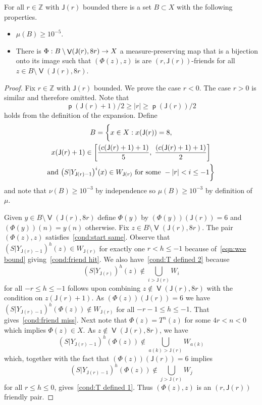\documentclass[AHL,Unicode,longabstracts,published]{cedram}
\DeclareMathOperator{\bad}{\mathsf{V}}
\DeclareMathOperator{\p}{\mathsf{p}}
\newcommand{\Z}{\mathbb{Z}}
\newcommand{\scl}{\mathsf{J}}
\let\originalleft\left
\let\originalright\right
\renewcommand{\left}{\mathopen{}\mathclose\bgroup\originalleft}
\renewcommand{\right}{\aftergroup\egroup\originalright}
\renewcommand*{\to}{\mathchoice{\longrightarrow}{\rightarrow}{\rightarrow}{\rightarrow}}
\begin{document}
\begin{theo}\label{thm:bounded wfriends}
For all $r \in \Z$ with $\scl(r)$ bounded there is a set $B \subset X$ with the following properties.
\begin{itemize}
\item $\mu(B) \ge 10^{-5}$.
\item There is $\Phi : B \setminus \bad(\scl(r),8r) \to X$ a measure-preserving map that is a bijection onto its image such that $(\Phi(z), z)$ is are $(r,\scl(r))$-friends for all $z \in B \setminus \bad(\scl(r),8r)$.
\end{itemize}
\end{theo}

\begin{proof}
Fix $r \in \Z$ with $\scl(r)$ bounded. We prove the case $r < 0$. The case $r > 0$ is similar and therefore omitted. Note that
\begin{equation}\label{eqn:wee bound}
\p(\scl(r)+1)/2\ge|r| \ge \p(\scl(r)) / 2
\end{equation}
holds from the definition of the expansion. Define
\begin{multline}\label{eqn:Bset}
B = \biggl\{ x \in X : x(\scl(r)) = 8,\\
x(\scl(r)+1)\in \left[\frac{(c(\scl(r)+1)+1)}{5},\;\frac{(c(\scl(r)+1)+1)}{2}
\right] \\
\text{and } \left(S|Y_{\scl(r)-1}\right)^i(x) \in W_{\scl(r)} \text{ for some } -|r| < i \le -1 \biggr\}
\end{multline}
and note that $\nu(B) \ge 10^{-3}$ by independence so $\mu(B) \ge 10^{-3}$ by definition of $\mu$.

Given $y \in B \setminus \bad(\scl(r),8r)$ define $\Phi(y)$ by $(\Phi(y))(\scl(r)) = 6$ and $(\Phi(y))(n) = y(n)$ otherwise. Fix $z \in B \setminus \bad(\scl(r),8r)$. The pair $(\Phi(z),z)$ satisfies~\eqref{cond:start same}. Observe that $(S|Y_{\scl(r)-1})^h(z) \in W_{\scl(r)}$ for exactly one $r< h\leq-1$ because of~\eqref{eqn:wee bound} giving~\eqref{cond:friend hit}. We also have~\eqref{cond:T defined 2} because
\[
(S|Y_{\scl(r)})^h(z) \notin \bigcup_{i>\scl(r)} W_i
\]
for all $-r \le h \le -1$ follows upon combining $z \notin \bad(\scl(r),8r)$ with the condition on $z(\scl(r) + 1)$. As $(\Phi(z))(\scl(r)) = 6$ we have $(S|Y_{\scl(r)-1})^h(\Phi(z)) \notin W_{\scl(r)}$ for all $-r-1 \le h \le -1$. That gives~\eqref{cond:friend miss}. Next note that $\Phi(z) = T^n(z)$ for some $4r<n<0$ which implies $\Phi(z) \in X$. As $z \notin \bad(\scl(r),8r)$, we have
\[
(S|Y_{\scl(r)-1})^h(\Phi(z)) \notin \bigcup_{a(k)>\scl(r)}W_{a(k)}
\]
which, together with the fact that $(\Phi(z))(\scl(r)) = 6$ implies
\[
(S|Y_{\scl(r)-1})^h(\Phi(z)) \notin \bigcup_{j>\scl(r)} W_j
\]
for all $r \le h \le 0$, gives~\eqref{cond:T defined 1}. Thus $(\Phi(z),z)$ is an $(r,\scl(r))$ friendly pair.
\end{proof}
\end{document}
